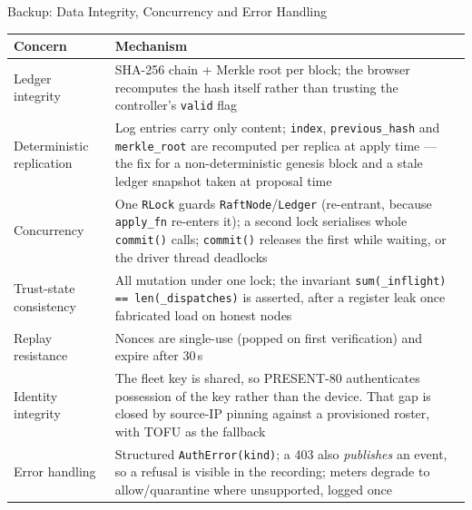 \documentclass[aspectratio=169, 11pt]{beamer}
\begin{document}
\begin{frame}{Backup: Data Integrity, Concurrency and Error Handling}
    \centering\tiny
    \begin{tabular}{@{}p{}p{}@{}}
      \toprule
      \textbf{Concern} & \textbf{Mechanism}\\
      \midrule
      Ledger integrity & SHA-256 chain + Merkle root per block; the browser recomputes the hash itself rather than trusting the controller's \texttt{valid} flag\\
      Deterministic replication & Log entries carry only content; \texttt{index}, \texttt{previous\_hash} and \texttt{merkle\_root} are recomputed per replica at apply time --- the fix for a non-deterministic genesis block and a stale ledger snapshot taken at proposal time\\
      Concurrency & One \texttt{RLock} guards \texttt{RaftNode}/\texttt{Ledger} (re-entrant, because \texttt{apply\_fn} re-enters it); a second lock serialises whole \texttt{commit()} calls; \texttt{commit()} releases the first while waiting, or the driver thread deadlocks\\
      Trust-state consistency & All mutation under one lock; the invariant \texttt{sum(\_inflight) == len(\_dispatches)} is asserted, after a register leak once fabricated load on honest nodes\\
      Replay resistance & Nonces are single-use (popped on first verification) and expire after 30\,s\\
      Identity integrity & The fleet key is shared, so PRESENT-80 authenticates possession of the key rather than the device. That gap is closed by source-IP pinning against a provisioned roster, with TOFU as the fallback\\
      Error handling & Structured \texttt{AuthError(kind)}; a 403 also \emph{publishes} an event, so a refusal is visible in the recording; meters degrade to allow/quarantine where unsupported, logged once\\
      \bottomrule
    \end{tabular}
\end{frame}
\end{document}
